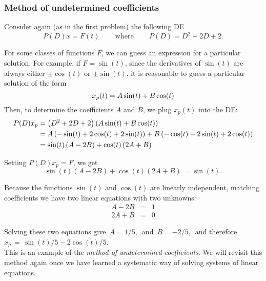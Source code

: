 \subsubsection{Method of undetermined coefficients}

Consider again (as in the first problem) the following DE
\begin{equation*}
  P(D)x=F(t)\,  \qquad \text {where}\,  \qquad P(D)=D^2+2D+2.
\end{equation*}

For some classes of functions $F$, we can guess an expression for a particular solution.
For example, if $F = \sin⁡(t)$, since the derivatives of $\sin⁡(t)$ are always
either $\pm \cos⁡ (t)$ or $\pm \sin⁡ (t)$,
it is reasonable to guess a particular solution of the form
\begin{equation*}
  \displaystyle  \displaystyle x_ p(t)=A\sin (t)+B\cos (t)
\end{equation*}
Then, to determine the coefficients $A$ and $B$, we plug $x _p(t)$ into the DE:
\begin{align*}
  \displaystyle \displaystyle P(D) x_p
  \displaystyle
  &= \displaystyle \left(D^2+2D+2\right)\left( A\sin (t)+B\cos (t)\right) \\
  \displaystyle
  &= \displaystyle A\left(-\sin (t)+2\cos (t)+2\sin (t)\right)
    +B \left( -\cos (t)-2\sin (t)+2\cos (t) \right) \\
  \displaystyle
  &= \displaystyle \sin (t) \left( A -2B\right) +\cos (t) \left(2A+B\right)\,
\end{align*}

Setting $P(D)x_ p= F$, we get
\begin{equation*}
  \sin (t) \left( A -2B\right) +\cos (t) \left(2A+B\right)\,  = \sin (t).
\end{equation*}

Because the functions $\sin⁡ (t)$ and $\cos⁡ (t)$ are linearly independent,
matching coefficients we have two linear equations with two unknowns:
\begin{eqnarray*}
  A - 2B &=& 1 \\
  2A + B &=& 0 
\end{eqnarray*}

Solving these two equations give $\, A=1/5,\,$ and $\, B=-2/5,\,$
and therefore $x_ p\, =\,  \sin (t)/5-2\cos (t)/5$.\\

This is an example of the \emph{\color{blue}method of undetermined coefficients}.
We will revisit this method again once we have learned
a systematic way of solving systems of linear equations.

